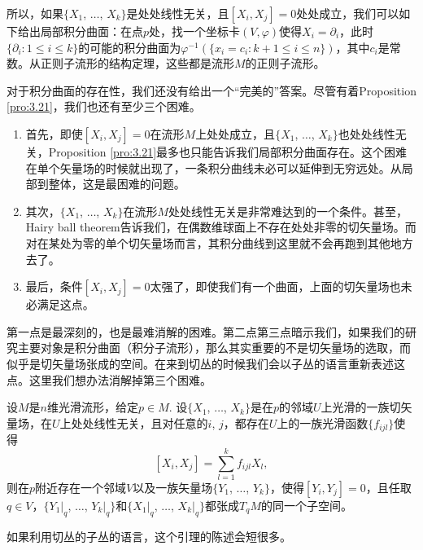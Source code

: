 所以，如果$\{X_1$, $\dots$, $X_k\}$是处处线性无关，且$[X_i,X_j]=0$处处成立，我们可以如下给出局部积分曲面：在点$p$处，找一个坐标卡$(V,\varphi)$使得$X_i=\partial_i$，此时$\{\partial_i:1\leq i \leq k\}$的可能的积分曲面为$\varphi^{-1}\left(\{x_i=c_i:k+1\leq i \leq n\}\right)$，其中$c_i$是常数。从正则子流形的结构定理，这些都是流形$M$的正则子流形。

\begin{para}\label{1.3.22}
对于积分曲面的存在性，我们还没有给出一个“完美的”答案。尽管有着Proposition \ref{pro:3.21}，我们也还有至少三个困难。

\begin{enumerate}[(1)]
\item 首先，即使$[X_i,X_j]=0$在流形$M$上处处成立，且$\{X_1$, $\dots$, $X_k\}$也处处线性无关，Proposition \ref{pro:3.21}最多也只能告诉我们局部积分曲面存在。这个困难在单个矢量场的时候就出现了，一条积分曲线未必可以延伸到无穷远处。从局部到整体，这是最困难的问题。
\item 其次，$\{X_1$, $\dots$, $X_k\}$在流形$M$处处线性无关是非常难达到的一个条件。甚至，Hairy ball theorem告诉我们，在偶数维球面上不存在处处非零的切矢量场。而对在某处为零的单个切矢量场而言，其积分曲线到这里就不会再跑到其他地方去了。
\item 最后，条件$[X_i,X_j]=0$太强了，即使我们有一个曲面，上面的切矢量场也未必满足这点。
\end{enumerate}

第一点是最深刻的，也是最难消解的困难。第二点第三点暗示我们，如果我们的研究主要对象是积分曲面（积分子流形），那么其实重要的不是切矢量场的选取，而似乎是切矢量场张成的空间。在来到切丛的时候我们会以子丛的语言重新表述这点。这里我们想办法消解掉第三个困难。
\end{para}

\begin{lem}\label{lem:3.23}
设$M$是$n$维光滑流形，给定$p\in M$. 设$\{X_1$, $\dots$, $X_k\}$是在$p$的邻域$U$上光滑的一族切矢量场，在$U$上处处线性无关，且对任意的$i$, $j$，都存在$U$上的一族光滑函数$\{f_{ijl}\}$使得
\[
	[X_i,X_j]=\sum_{l=1}^kf_{ijl}X_l,
\]
则在$p$附近存在一个邻域$V$以及一族矢量场$\{Y_1$, $\dots$, $Y_k\}$，使得$[Y_i,Y_j]=0$，且任取$q\in V$，$\{Y_1|_q$, $\dots$, $Y_k|_q\}$和$\{X_1|_q$, $\dots$, $X_k|_q\}$都张成$T_qM$的同一个子空间。
\end{lem}

如果利用切丛的子丛的语言，这个引理的陈述会短很多。


